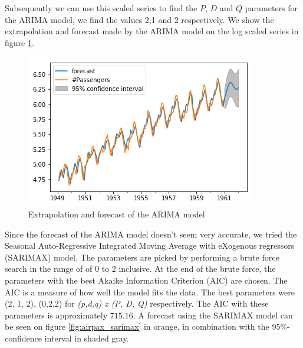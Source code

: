 \documentclass[a4paper, 10pt, conference]{ieeeconf}
\begin{document}
Subsequently we can use this scaled series to find the $P$, $D$ and $Q$ parameters for the ARIMA model, we find the values 2,1 and 2 respectively. We show the extrapolation and forecast made by the ARIMA model on the log scaled series in figure \ref{fig:airpax_arima}.

\begin{figure}[!ht]
    \centering
    \includegraphics[width=\linewidth]{report/images/airpax_arima.png}
    \caption{Extrapolation and forecast of the ARIMA model}
    \label{fig:airpax_arima}
\end{figure}

Since the forecast of the ARIMA model doesn't seem very accurate, we tried the Seasonal Auto-Regressive Integrated Moving Average with eXogenous regressors (SARIMAX) model. The parameters are picked by performing a brute force search in the range of of 0 to 2 inclusive. At the end of the brute force, the parameters with the best Akaike Information Criterion (AIC) are chosen. The AIC is a measure of how well the model fits the data. The best parameters were (2, 1, 2), (0,2,2) for \textit{(p,d,q) x (P, D, Q)} respectively. The AIC with these parameters is approximately $715.16$. A forecast using the SARIMAX model can be seen on figure \ref{fig:airpax_sarimax} in orange, in combination with the $95\%$-confidence interval in shaded gray.
\end{document}
